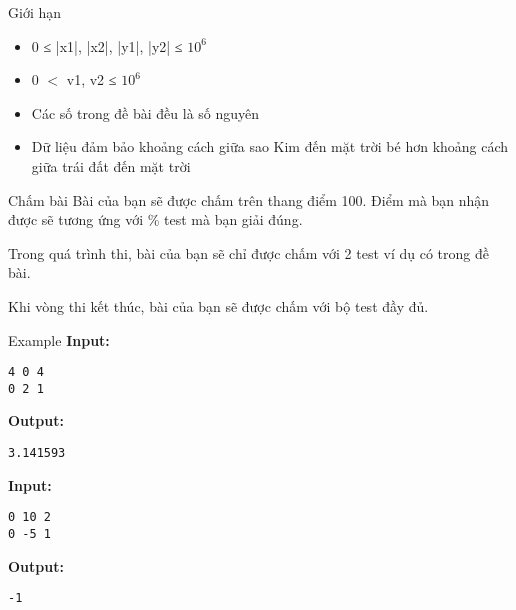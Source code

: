Giới hạn
\begin{itemize}
	\item     0 ≤ |x1|, |x2|, |y1|, |y2| ≤ $10^{6}$
	\item     0 $<$ v1, v2 ≤ $10^{6}$
	\item     Các số trong đề bài đều là số nguyên   
	\item      Dữ liệu đảm bảo khoảng cách giữa sao Kim đến mặt trời bé hơn khoảng cách giữa trái đất đến mặt trời    
\end{itemize}
Chấm bài
Bài của bạn sẽ được chấm trên thang điểm 100. Điểm mà bạn nhận được sẽ tương ứng với \% test mà bạn giải đúng.  

   Trong quá trình thi, bài của bạn sẽ chỉ được chấm với 2 test ví dụ có trong đề bài.  

   Khi vòng thi kết thúc, bài của bạn sẽ được chấm với bộ test đầy đủ.  
\begin{itemize}
\end{itemize}
Example
\textbf{    Input:   }
\begin{verbatim}
4 0 4
0 2 1\end{verbatim}

\textbf{    Output:   }
\begin{verbatim}
3.141593

\end{verbatim}



\textbf{    Input:   }
\begin{verbatim}
0 10 2
0 -5 1\end{verbatim}

\textbf{    Output:   }
\begin{verbatim}
-1\end{verbatim}